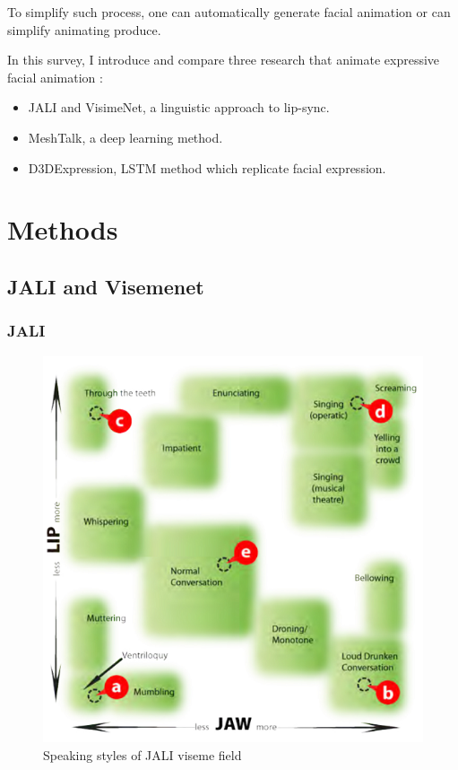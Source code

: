 \documentclass[10pt,twocolumn,letterpaper]{article}
\begin{document}
To simplify such process, one can automatically generate facial animation or can simplify animating produce.

In this survey, I introduce and compare three research that animate expressive facial animation :
\begin{itemize}
 \item JALI\cite{edwardsJALIAnimatorcentricViseme2016} and VisimeNet\cite{zhouVisemenetAudiodrivenAnimatorcentric2018}, a linguistic approach to lip-sync.
 \item MeshTalk\cite{richardMeshTalk3DFace2021}, a deep learning method.
 \item D3DExpression\cite{potamiasLearningGenerateCustomized2020}, LSTM method which replicate facial expression.
\end{itemize}






\section{Methods}

\subsection{JALI and Visemenet}

\subsubsection{JALI}

\begin{figure}
   \includegraphics[width=1.0\linewidth]{jaliStyles}
   
   \caption{Speaking styles of JALI viseme field}
   \label{fig:jaliStyles}
\end{figure}
\end{document}
